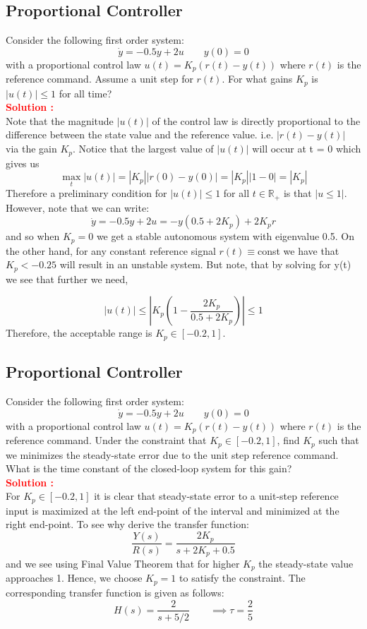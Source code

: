 \documentclass[12pt]{article}
\begin{document}
\subsection{Proportional Controller}

Consider the following first order system:
\[
\dot{y} = -0.5y + 2u \qquad  y(0) = 0
\]
with a proportional control law $u(t) = K_p(r(t) - y(t))$ where $r(t)$ is the reference command. Assume a unit step for $r(t)$. For what gains $K_p$ is $|u(t)| \leq 1$ for all time?\\
\textbf{\textcolor{red}{Solution :}} \\
Note that the magnitude $|u (t)|$ of the control law is directly proportional to the difference
between the state value and the reference value. i.e. $|r(t) - y(t)|$ via the gain $K_p$. Notice that the largest value of $|u(t)|$ will occur at t = 0 which gives us
\[
\max_t |u(t)| =|K_p||r(0)-y(0)|=|K_p||1-0|=|K_p|
\]
Therefore a preliminary condition for $|u(t)| \leq 1$ for all $t \in \mathbb{R}_+$ is that $|u\leq 1|$. However, note that we can write:
\[
\dot{y}=-0.5y +2 u= -y (0.5 + 2K_p) + 2K_p r
\]
and so when $K_p = 0$ we get a stable autonomous system with eigenvalue 0.5. On the
other hand, for any constant reference signal $r(t) \equiv$const we have that $K_p < -0.25$ will result in an unstable system. But note, that by solving for y(t) we see that further we
need,

$$|u (t)| \leq \left| K_p \left( 1- \frac{2 K_p}{0.5 + 2 K_p}\right) \right|\leq 1$$
Therefore, the acceptable range is $K_p \in [-0.2, 1]$.
\clearpage

\subsection{Proportional Controller}

Consider the following first order system:
\[
\dot{y} = -0.5y + 2u \qquad  y(0) = 0
\]
with a proportional control law $u(t) = K_p(r(t) - y(t))$ where $r(t)$ is the reference command. Under the constraint that $K_p \in [-0.2, 1]$, find $K_p$ such that we minimizes the steady-state error due to the unit step reference command. What is the time constant of the closed-loop system for this gain?\\
\textbf{\textcolor{red}{Solution :}} \\
For $K_p \in [-0.2, 1]$ it is clear that steady-state error to a unit-step reference input is
maximized at the left end-point of the interval and minimized at the right end-point. To
see why derive the transfer function:
\[
\frac{Y(s)}{R(s)}=\frac{2 K_p}{s+2 K_p +0.5}
\]
and we see using Final Value Theorem that for higher $K_p$ the steady-state value approaches 1. Hence, we choose $K_p = 1$ to satisfy the constraint. The corresponding transfer function is given as follows:
\[
H(s) =\frac{2}{s+5/2} \qquad \implies \tau=\frac{2}{5}
\]
\clearpage
\end{document}
